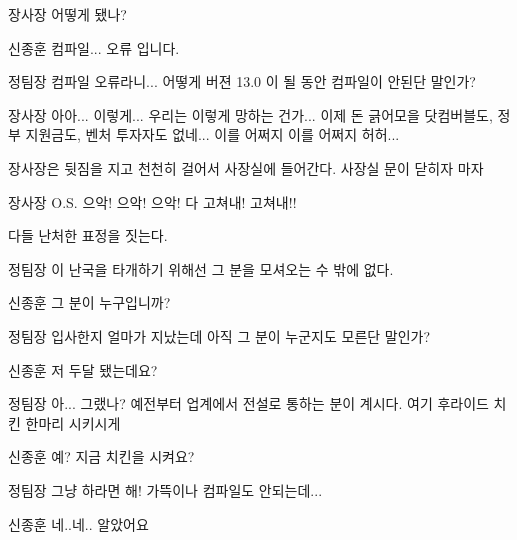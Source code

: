\documentclass{screenplay}
\begin{document}
    \begin{dialogue}{장사장}
        어떻게 됐나?
    \end{dialogue}
    \begin{dialogue}{신종훈}
        컴파일... 오류 입니다.
    \end{dialogue}
    \begin{dialogue}{정팀장}
        컴파일 오류라니... 어떻게 버젼 13.0 이 될 동안 컴파일이 안된단 말인가?
    \end{dialogue}
    \begin{dialogue}{장사장}
        아아... 이렇게... 우리는 이렇게 망하는 건가... 이제 돈 긁어모을 닷컴버블도, 정부 지원금도, 벤처 투자자도 없네... 이를 어쩌지 이를 어쩌지 허허...
    \end{dialogue}
    
    장사장은 뒷짐을 지고 천천히 걸어서 사장실에 들어간다. 사장실 문이 닫히자 마자
    
    \begin{dialogue}{장사장}
        O.S. 으악! 으악! 으악! 다 고쳐내! 고쳐내!!
    \end{dialogue}
    
    다들 난처한 표정을 짓는다.
    
    \begin{dialogue}{정팀장}
        이 난국을 타개하기 위해선 그 분을 모셔오는 수 밖에 없다.
    \end{dialogue}
    \begin{dialogue}{신종훈}
        그 분이 누구입니까?
    \end{dialogue}
    \begin{dialogue}[한심하다는 듯이]{정팀장}
        입사한지 얼마가 지났는데 아직 그 분이 누군지도 모른단 말인가?
    \end{dialogue}
    \begin{dialogue}{신종훈}
        저 두달 됐는데요?
    \end{dialogue}
    \begin{dialogue}[한숨쉬며]{정팀장}
        아... 그랬나?
        예전부터 업계에서 전설로 통하는 분이 계시다.
        여기 후라이드 치킨 한마리 시키시게
    \end{dialogue}
    \begin{dialogue}[의아해하며]{신종훈}
        예? 지금 치킨을 시켜요?
    \end{dialogue}
    \begin{dialogue}[귀찮다는 말투]{정팀장}
        그냥 하라면 해! 가뜩이나 컴파일도 안되는데...
    \end{dialogue}
    \begin{dialogue}{신종훈}
        네..네.. 알았어요
    \end{dialogue}
    \fadeout
    
\end{document}
